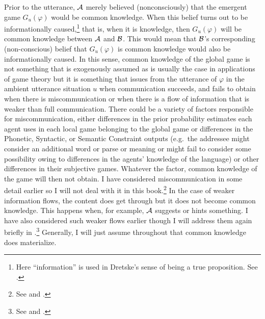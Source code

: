Prior to the utterance, $\cal A$ merely believed (nonconsciously) that the emergent game $G_u(\varphi)$ would be common knowledge. When this belief turns out to be informationally caused,\footnote{Here ``information'' is used in Dretske's sense of being a true proposition. See .} that is, when it is knowledge, then $G_u(\varphi)$ will be common knowledge between $\cal A$ and $\cal B$. This would mean that $\cal B$'s corresponding (non-conscious) belief that $G_u(\varphi)$ is common knowledge would also be informationally caused. In this sense, common knowledge of the global game is not something that is exogenously assumed as is usually the case in applications of game theory but it is something that issues from the utterance of $\varphi$ in the ambient utterance situation $u$ when communication succeeds, and fails to obtain when there is miscommunication or when there is a flow of information that is weaker than full communication. There could be a variety of factors responsible for miscommunication, either differences in the prior probability estimates each agent uses in each local game belonging to the global game or differences in the Phonetic, Syntactic, or Semantic Constraint outputs (e.g.\ the addressee might consider an additional word or parse or meaning or might fail to consider some possibility owing to differences in the agents' knowledge of the language) or other differences in their subjective games. Whatever the factor, common knowledge of the game will then not obtain. I have considered miscommunication in some detail earlier so I will not deal with it in this book.\footnote{See \citet[Chapter~9]{parikh:ul} and \citet[Section~5.3]{parikh:le}.} In the case of weaker information flows, the content does get through but it does not become common knowledge. This happens when, for example, $\cal A$ suggests or hints something. I have also considered such weaker flows earlier though I will address them again briefly in .\footnote{See \citet[Section~6.5]{parikh:ul} and \citet[Section~5.10]{parikh:le}.} Generally, I will just assume throughout that common knowledge does materialize.

